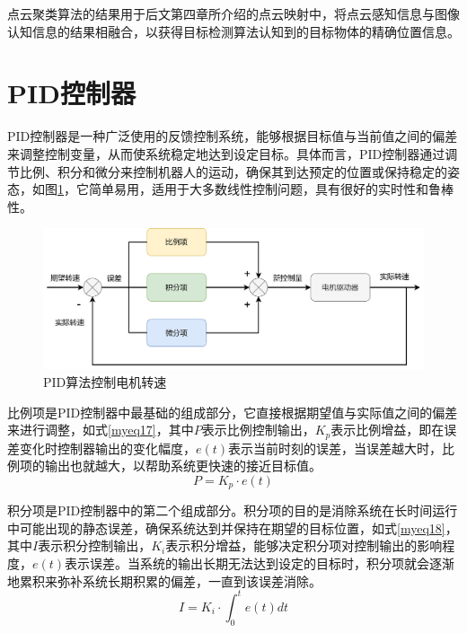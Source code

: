 点云聚类算法的结果用于后文第四章所介绍的点云映射中，将点云感知信息与图像认知信息的结果相融合，以获得目标检测算法认知到的目标物体的精确位置信息。

\section{PID控制器}

PID控制器是一种广泛使用的反馈控制系统，能够根据目标值与当前值之间的偏差来调整控制变量，从而使系统稳定地达到设定目标。具体而言，PID控制器通过调节比例、积分和微分来控制机器人的运动，确保其到达预定的位置或保持稳定的姿态，如图\ref{pid}，它简单易用，适用于大多数线性控制问题，具有很好的实时性和鲁棒性。
\begin{figure}[htbp]
    \centering
    \includegraphics[scale=0.06]{Fig/pid.png}
    \caption{\label{pid}PID算法控制电机转速}
\end{figure}

比例项是PID控制器中最基础的组成部分，它直接根据期望值与实际值之间的偏差来进行调整，如式\ref{myeq17}，其中$P$表示比例控制输出，${K_p}$表示比例增益，即在误差变化时控制器输出的变化幅度，$e\left( t \right)$表示当前时刻的误差，当误差越大时，比例项的输出也就越大，以帮助系统更快速的接近目标值。
\begin{equation}
    P = {K_p} \cdot e\left( t \right)
    \label{myeq17}
\end{equation}

积分项是PID控制器中的第二个组成部分。积分项的目的是消除系统在长时间运行中可能出现的静态误差，确保系统达到并保持在期望的目标位置，如式\ref{myeq18}，其中$I$表示积分控制输出，${K_i}$表示积分增益，能够决定积分项对控制输出的影响程度，${e\left( t \right)}$表示误差。当系统的输出长期无法达到设定的目标时，积分项就会逐渐地累积来弥补系统长期积累的偏差，一直到该误差消除。
\begin{equation}
    I = {K_i} \cdot \int_0^t {e\left( t \right)dt} 
    \label{myeq18}
\end{equation}

